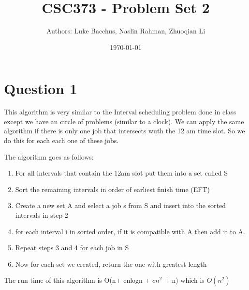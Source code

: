 \documentclass[12pt]{article}
\title{\textbf{CSC373 - Problem Set 2}}
\author{Authors: Luke Bacchus, Naslin Rahman, Zhuoqian Li}
\date{\today}
\begin{document}
\maketitle
\section*{Question 1}
This algorithm is very similar to the Interval scheduling problem done in class except we have an circle of problems (similar to a clock). We can apply the same algorithm if there is only one job that intersects wuth the 12 am time slot. So we do this for each each one of these jobs.
 
 The algorithm goes as follows:
 \begin{enumerate}
     \item For all intervals that contain the 12am slot put them into a set called S
     \item Sort the remaining intervals in order of earliest finish time (EFT)
     \item Create a new set A and select a job s from S and insert into the sorted intervals in step 2
     \item for each interval i in sorted order, if it is compatible with A then add it to A. 
     \item Repeat steps 3 and 4 for each job in S 
     \item Now for each set we created, return the one with greatest length
 \end{enumerate}

The run time of this algorithm is O(n+ cnlogn + $cn^2$ + n) which is $O(n^2)$

\newpage
\end{document}

